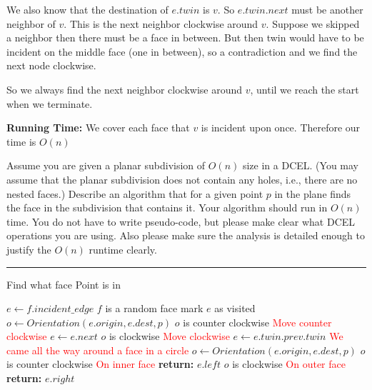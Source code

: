 \documentclass[11pt]{article}
\begin{document}
We also know that the destination of $e.twin$ is $v$. So $e.twin.next$ must be another neighbor of $v$.
This is the next neighbor clockwise around $v$. Suppose we skipped a neighbor then there must be a face in between.
But then twin would have to be incident on the middle face (one in between), so a contradiction and we find the next node clockwise.

So we always find the next neighbor clockwise around $v$, until we reach the start when we terminate.

\textbf{Running Time:} We cover each face that $v$ is incident upon once. Therefore our time is $O(n)$





Assume you are given a planar subdivision of $O(n)$ size in a DCEL. (You may
assume that the planar subdivision does not contain any holes, i.e., there are
no nested faces.) Describe an algorithm that for a given point $p$ in the plane
finds the face in the subdivision that contains it. Your algorithm should run in
$O(n)$ time. You do not have to write pseudo-code, but please make clear what
DCEL operations you are using. Also please make sure the analysis is detailed
enough to justify the $O(n)$ runtime clearly.

\hrule



\begin{algorithm}
    \caption{Find what face Point is in}
    \label{alg:point}
    \begin{algorithmic}[1]
        \State $e \gets f.incident\_edge$ $f$ is a random face
            \State mark $e$ as visited
            \State $o \gets Orientation(e.origin, e.dest, p)$
            \If $o$ is counter clockwise
                \State \textcolor{red}{Move counter clockwise}
                \State $e \gets e.next$
            \ElsIf $o$ is clockwise
                \State \textcolor{red}{Move clockwise}
                \State $e \gets e.twin.prev.twin$
            \EndIf
        \EndWhile
        \State \textcolor{red}{We came all the way around a face in a circle}
        \State $o \gets Orientation(e.origin, e.dest, p)$
        \If $o$ is counter clockwise
            \State \textcolor{red}{On inner face}
            \State \textbf{return: } $e.left$
        \ElsIf $o$ is clockwise
            \State \textcolor{red}{On outer face}
            \State \textbf{return: } $e.right$
        \EndIf
    \EndFunction
    \end{algorithmic}
\end{algorithm}
\end{document}
